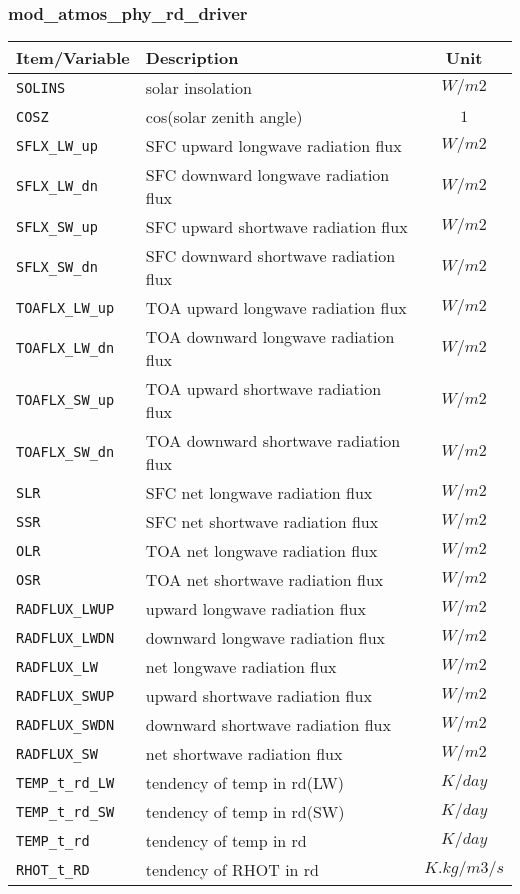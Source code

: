 \subsubsection{mod\_atmos\_phy\_rd\_driver}
 \begin{tabularx}{150mm}{|l|X|c|} \hline
 \rowcolor[gray]{0.9} Item/Variable & Description  & Unit \\ \hline
  \verb|SOLINS| & solar insolation & $W/m2$ \\\hline
  \verb|COSZ| & cos(solar zenith angle) & $1$ \\\hline
  \verb|SFLX_LW_up| & SFC upward longwave radiation flux    & $W/m2$ \\\hline
  \verb|SFLX_LW_dn| & SFC downward longwave radiation flux  & $W/m2$ \\\hline
  \verb|SFLX_SW_up| & SFC upward shortwave radiation flux   & $W/m2$ \\\hline
  \verb|SFLX_SW_dn| & SFC downward shortwave radiation flux & $W/m2$ \\\hline
  \verb|TOAFLX_LW_up| & TOA upward longwave radiation flux  & $W/m2$ \\\hline
  \verb|TOAFLX_LW_dn| & TOA downward longwave radiation flux &  $W/m2$ \\\hline
  \verb|TOAFLX_SW_up| & TOA upward shortwave radiation flux  & $W/m2$ \\\hline
  \verb|TOAFLX_SW_dn| & TOA downward shortwave radiation flux & $W/m2$ \\\hline
  \verb|SLR| & SFC net longwave radiation flux & $W/m2$ \\\hline
  \verb|SSR| & SFC net shortwave radiation flux & $W/m2$ \\\hline
  \verb|OLR| & TOA net longwave radiation flux & $W/m2$ \\\hline
  \verb|OSR| & TOA net shortwave radiation flux & $W/m2$ \\\hline
  \verb|RADFLUX_LWUP| & upward longwave radiation flux & $W/m2$ \\\hline
  \verb|RADFLUX_LWDN| & downward longwave radiation flux & $W/m2$ \\\hline
  \verb|RADFLUX_LW| & net longwave radiation flux & $W/m2$ \\\hline
  \verb|RADFLUX_SWUP| & upward shortwave radiation flux & $W/m2$ \\\hline
  \verb|RADFLUX_SWDN| & downward shortwave radiation flux & $W/m2$ \\\hline
  \verb|RADFLUX_SW| & net shortwave radiation flux & $W/m2$ \\\hline
  \verb|TEMP_t_rd_LW| & tendency of temp in rd(LW) & $K/day$ \\\hline
  \verb|TEMP_t_rd_SW| & tendency of temp in rd(SW) & $K/day$ \\\hline
  \verb|TEMP_t_rd| & tendency of temp in rd & $K/day$ \\\hline
  \verb|RHOT_t_RD| & tendency of RHOT in rd & $K.kg/m3/s$ \\\hline
 \end{tabularx}

